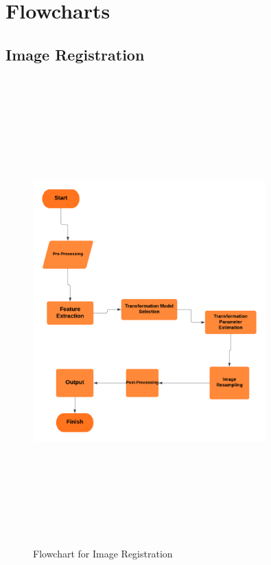 \section{{{\fontsize{17}{21}\selectfont \textbf{Flowcharts}}}}
\setlength{\columnsep}{1.5cm}

\vspace{0.5cm}
\subsection{{{\fontsize{14}{19}\selectfont \textbf{Image Registration}}}}
\begin{figure}[h]
  \centering
  \includegraphics[width=0.8\textwidth,height=18cm]{sections/LBP/Image Reg - Page 1.png}
  \caption{Flowchart for Image Registration}
  \label{fig:figure_label}
\end{figure}
\newpage

